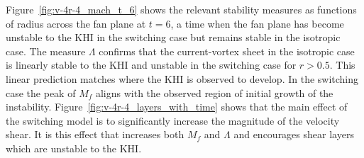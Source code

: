 
Figure~\ref{fig:v-4r-4_mach_t_6} shows the relevant stability measures as functions of radius across the fan plane at $t=6$, a time when the fan plane has become unstable to the KHI in the switching case but remains stable in the isotropic case. The measure $\Lambda$ confirms that the current-vortex sheet in the isotropic case is linearly stable to the KHI and unstable in the switching case for $r>0.5$. This linear prediction matches where the KHI is observed to develop. In the switching case the peak of $M_f$ aligns with the observed region of initial growth of the instability. Figure~\ref{fig:v-4r-4_layers_with_time} shows that the main effect of the switching model is to significantly increase the magnitude of the velocity shear. It is this effect that increases both $M_f$ and $\Lambda$ and encourages shear layers which are unstable to the KHI.



